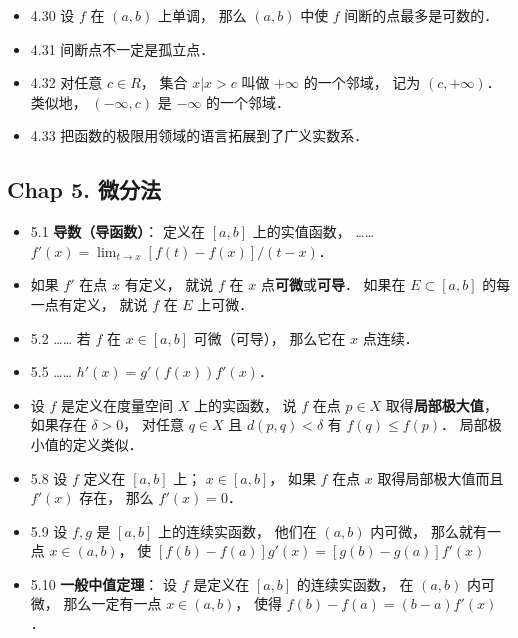 \begin{itemize}
\item 4.30 设 $f$ 在 $(a,b)$ 上单调， 那么 $(a,b)$ 中使 $f$ 间断的点最多是可数的．

\item 4.31 间断点不一定是孤立点． 

\item 4.32 对任意 $c\in R$， 集合 ${x|x>c}$ 叫做 $+\infty$ 的一个邻域， 记为 $(c,+\infty)$． 类似地， $(-\infty, c)$ 是 $-\infty$ 的一个邻域．

\item 4.33 把函数的极限用领域的语言拓展到了广义实数系．
\end{itemize}

\subsection{Chap 5. 微分法}
\begin{itemize}
\item 5.1 \textbf{导数（导函数）}： 定义在 $[a,b]$ 上的实值函数， …… $f'(x) = \lim_{t\to x} [f(t)-f(x)]/(t-x)$．

\item 如果 $f'$ 在点 $x$ 有定义， 就说 $f$ 在 $x$ 点\textbf{可微}或\textbf{可导}． 如果在 $E\subset [a,b]$ 的每一点有定义， 就说 $f$ 在 $E$ 上可微．

\item 5.2 …… 若 $f$ 在 $x\in [a,b]$ 可微（可导）， 那么它在 $x$ 点连续．

\item 5.5 …… $h'(x) = g'(f(x))f'(x)$．

\item 设 $f$ 是定义在度量空间 $X$ 上的实函数， 说 $f$ 在点 $p\in X$ 取得\textbf{局部极大值}， 如果存在 $\delta>0$， 对任意 $q\in X$ 且 $d(p,q)<\delta$ 有 $f(q)\leqslant f(p)$． 局部极小值的定义类似．

\item 5.8 设 $f$ 定义在 $[a,b]$ 上； $x\in [a,b]$， 如果 $f$ 在点 $x$ 取得局部极大值而且 $f'(x)$ 存在， 那么 $f'(x) = 0$．

\item 5.9 设 $f,g$ 是 $[a,b]$ 上的连续实函数， 他们在 $(a,b)$ 内可微， 那么就有一点 $x\in (a,b)$， 使 $[f(b)-f(a)]g'(x) = [g(b)-g(a)]f'(x)$

\item 5.10 \textbf{一般中值定理}： 设 $f$ 是定义在 $[a,b]$ 的连续实函数， 在 $(a,b)$ 内可微， 那么一定有一点 $x\in (a,b)$， 使得 $f(b)-f(a) = (b-a)f'(x)$．
\end{itemize}


